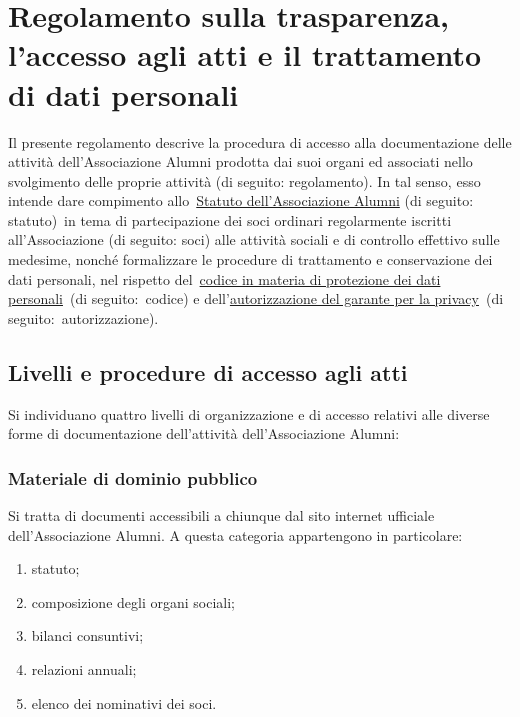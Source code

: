 \section{Regolamento sulla trasparenza, l'accesso agli atti e il trattamento
di dati personali}

Il presente regolamento descrive la procedura di accesso alla
documentazione delle attività dell’Associazione Alumni prodotta dai suoi
organi ed associati nello svolgimento delle proprie attività (di seguito:
regolamento). In tal senso, esso intende dare compimento
allo \href{http://www.alumniscuolagalileiana.it/wp-content/uploads/2017/03/Statuto-Alumni-SGSS.pdf}{Statuto
dell’Associazione Alumni} (di seguito: statuto) in tema di partecipazione
dei soci ordinari regolarmente iscritti all’Associazione (di seguito: soci)
alle attività sociali e di controllo effettivo sulle medesime, nonché
formalizzare le procedure di trattamento e conservazione dei dati
personali, nel rispetto del \href{http://www.garanteprivacy.it/web/guest/home/docweb/-/docweb-display/docweb/1311248}{codice in materia di protezione dei dati
personali} (di seguito: codice) e dell’\href{http://garanteprivacy.it/web/guest/home/docweb/-/docweb-display/docweb/5803310}{autorizzazione del garante per la
privacy} (di seguito: autorizzazione). 

\subsection{Livelli e procedure di accesso agli atti}

Si individuano quattro livelli di organizzazione e di accesso relativi alle diverse forme di documentazione dell’attività dell’Associazione Alumni:

\subsubsection{Materiale di dominio pubblico}\label{materiale-di-dominio-pubblico}

Si tratta di documenti accessibili a chiunque dal sito internet ufficiale dell’Associazione Alumni. A questa categoria appartengono in particolare: 
\begin{enumerate}
\item statuto;
\item composizione degli organi sociali;
\item bilanci consuntivi;
\item relazioni annuali;
\item elenco dei nominativi dei soci.
\end{enumerate}

